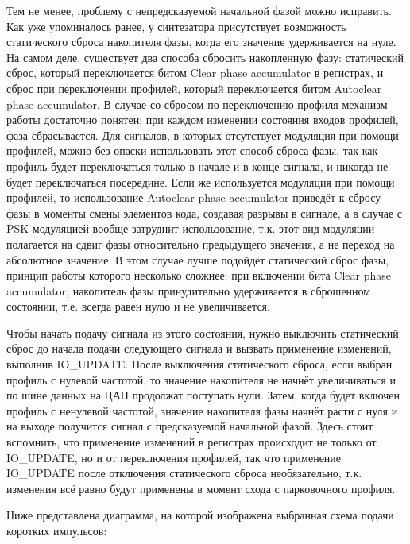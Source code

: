 \documentclass[rusmathsym, eqnumwithinsec, amspack, hyperref]{bomgost}
\begin{document}
Тем не менее, проблему с непредсказуемой начальной фазой можно исправить. Как уже упоминалось ранее, у синтезатора присутствует возможность статического сброса накопителя фазы, когда его значение удерживается на нуле. На самом деле, существует два способа сбросить накопленную фазу: статический сброс, который переключается битом \textenglish{Clear phase accumulator} в регистрах, и сброс при переключении профилей, который переключается битом Autoclear phase accumulator. В случае со сбросом по переключению профиля механизм работы достаточно понятен: при каждом изменении состояния входов профилей, фаза сбрасывается. Для сигналов, в которых отсутствует модуляция при помощи профилей, можно без опаски использовать этот способ сброса фазы, так как профиль будет переключаться только в начале и в конце сигнала, и никогда не будет переключаться посередине. Если же используется модуляция при помощи профилей, то использование Autoclear phase accumulator приведёт к сбросу фазы в моменты смены элементов кода, создавая разрывы в сигнале, а в случае с PSK модуляцией вообще затруднит использование, т.к. этот вид модуляции полагается на сдвиг фазы относительно предыдущего значения, а не переход на абсолютное значение. В этом случае лучше подойдёт статический сброс фазы, принцип работы которого несколько сложнее: при включении бита Clear phase accumulator, накопитель фазы принудительно удерживается в сброшенном состоянии, т.е. всегда равен нулю и не увеличивается.

Чтобы начать подачу сигнала из этого состояния, нужно выключить статический сброс до начала подачи следующего сигнала и вызвать применение изменений, выполнив IO\_UPDATE. После выключения статического сброса, если выбран профиль с нулевой частотой, то значение накопителя не начнёт увеличиваться и по шине данных на ЦАП продолжат поступать нули. Затем, когда будет включен профиль с ненулевой частотой, значение накопителя фазы начнёт расти с нуля и на выходе получится сигнал с предсказуемой начальной фазой. Здесь стоит вспомнить, что применение изменений в регистрах происходит не только от IO\_UPDATE, но и от переключения профилей, так что применение IO\_UPDATE после отключения статического сброса необязательно, т.к. изменения всё равно будут применены в момент схода с парковочного профиля.

Ниже представлена диаграмма, на которой изображена выбранная схема подачи коротких импульсов:
\end{document}
